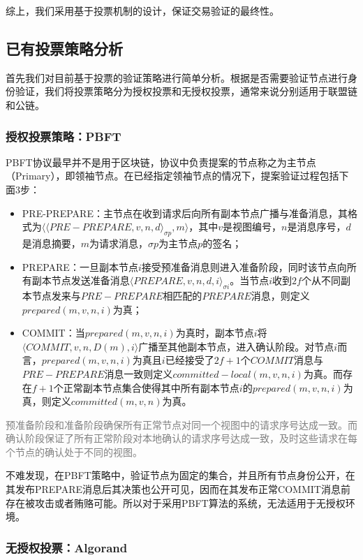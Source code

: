 综上，我们采用基于投票机制的设计，保证交易验证的最终性。


\subsection{已有投票策略分析}
首先我们对目前基于投票的验证策略进行简单分析。根据是否需要验证节点进行身份验证，我们将投票策略分为授权投票和无授权投票，通常来说分别适用于联盟链和公链。

\subsubsection{授权投票策略：PBFT}
PBFT协议\cite{castro1999practical}最早并不是用于区块链，协议中负责提案的节点称之为主节点（Primary），即领袖节点。在已经指定领袖节点的情况下，提案验证过程包括下面3步：
\begin{itemize}
	\item PRE-PREPARE：主节点在收到请求后向所有副本节点广播与准备消息，其格式为$\langle \langle PRE-PREPARE,v,n,d \rangle_{\sigma p},m \rangle$，其中$v$是视图编号，$n$是消息序号，$d$是消息摘要，$m$为请求消息，$\sigma p$为主节点$p$的签名；
	\item PREPARE：一旦副本节点$i$接受预准备消息则进入准备阶段，同时该节点向所有副本节点发送准备消息$\langle PREPARE,v,n,d,i\rangle_{\sigma i}$。当节点$i$收到$2f$个从不同副本节点发来与$PRE-PREPARE$相匹配的$PREPARE$消息，则定义$prepared(m,v,n,i)$为真；
	\item COMMIT：当$prepared(m,v,n,i)$为真时，副本节点$i$将$\langle COMMIT,v,n,D(m),i\rangle$广播至其他副本节点，进入确认阶段。对节点$i$而言，$prepared(m,v,n,i)$为真且$i$已经接受了$2f+1$个$COMMIT$消息与$PRE-PREPARE$消息一致则定义$committed-local(m,v,n,i)$为真。而存在$f+1$个正常副本节点集合使得其中所有副本节点$i$的$prepared(m,v,n,i)$为真，则定义$committed(m,v,n)$为真。
\end{itemize}

\textcolor{gray}{预准备阶段和准备阶段确保所有正常节点对同一个视图中的请求序号达成一致。而确认阶段保证了所有正常阶段对本地确认的请求序号达成一致，及时这些请求在每个节点的确认处于不同的视图。}

不难发现，在PBFT策略中，验证节点为固定的集合，并且所有节点身份公开，在其发布PREPARE消息后其决策也公开可见，因而在其发布正常COMMIT消息前存在被攻击或者贿赂可能。所以对于采用PBFT算法的系统，无法适用于无授权环境。

\subsubsection{无授权投票：Algorand}

